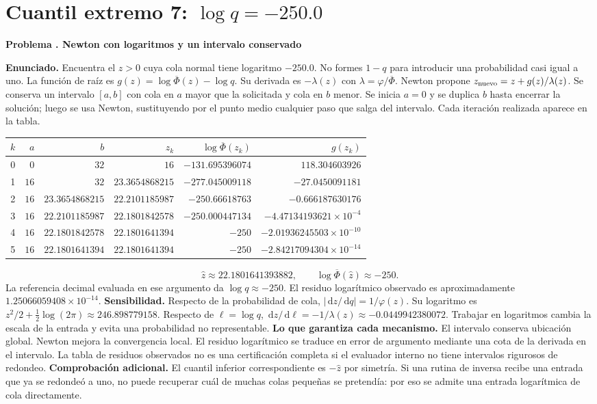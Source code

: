\documentclass[11pt,a4paper]{article}
\newcommand{\dd}{\,\mathrm d}
\theoremstyle{definition}
\newcounter{problema}
\newenvironment{resuelto}[1]{\refstepcounter{problema}\par\medskip\Needspace{6\baselineskip}\textbf{Problema \theproblema. #1}\par}{\par\medskip}
\newcommand{\SF}{\overline\Phi}
\begin{document}
\section{\texorpdfstring{Cuantil extremo 7: $\log q=-250.0$}{Cuantil extremo 7: log q=-250.0}}
\begin{resuelto}{Newton con logaritmos y un intervalo conservado}
\textbf{Enunciado.} Encuentra el $z>0$ cuya cola normal tiene logaritmo $-250.0$. No formes $1-q$ para introducir una probabilidad casi igual a uno.
La función de raíz es $g(z)=\log\SF(z)-\log q$. Su derivada es $-\lambda(z)$ con $\lambda=\varphi/\SF$. Newton propone $z_{\rm nuevo}=z+g(z)/\lambda(z)$. Se conserva un intervalo $[a,b]$ con cola en $a$ mayor que la solicitada y cola en $b$ menor.
Se inicia $a=0$ y se duplica $b$ hasta encerrar la solución; luego se usa Newton, sustituyendo por el punto medio cualquier paso que salga del intervalo. Cada iteración realizada aparece en la tabla.

\begin{center}\small\begin{tabular}{rrrrrr}
\toprule
$k$&$a$&$b$&$z_k$&$\log\SF(z_k)$&$g(z_k)$\\
\midrule
0&$0$&$32$&$16$&$-131.695396074$&$118.304603926$\\
1&$16$&$32$&$23.3654868215$&$-277.045009118$&$-27.0450091181$\\
2&$16$&$23.3654868215$&$22.2101185987$&$-250.66618763$&$-0.666187630176$\\
3&$16$&$22.2101185987$&$22.1801842578$&$-250.000447134$&$-4.47134193621\times10^{-4}$\\
4&$16$&$22.1801842578$&$22.1801641394$&$-250$&$-2.01936245503\times10^{-10}$\\
5&$16$&$22.1801641394$&$22.1801641394$&$-250$&$-2.84217094304\times10^{-14}$\\
\bottomrule\end{tabular}\end{center}
\[
\widehat z\approx22.1801641393882,\qquad \log\SF(\widehat z)\approx-250.
\]
La referencia decimal evaluada en ese argumento da $\log q\approx-250$. El residuo logarítmico observado es aproximadamente $1.25066059408\times10^{-14}$.
\textbf{Sensibilidad.} Respecto de la probabilidad de cola, $|\dd z/\dd q|=1/\varphi(z)$. Su logaritmo es $z^2/2+\tfrac12\log(2\pi)\approx246.898779158$. Respecto de $\ell=\log q$, $\dd z/\dd\ell=-1/\lambda(z)\approx-0.0449942380072$. Trabajar en logaritmos cambia la escala de la entrada y evita una probabilidad no representable.
\textbf{Lo que garantiza cada mecanismo.} El intervalo conserva ubicación global. Newton mejora la convergencia local. El residuo logarítmico se traduce en error de argumento mediante una cota de la derivada en el intervalo. La tabla de residuos observados no es una certificación completa si el evaluador interno no tiene intervalos rigurosos de redondeo.
\textbf{Comprobación adicional.} El cuantil inferior correspondiente es $-\widehat z$ por simetría. Si una rutina de inversa recibe una entrada que ya se redondeó a uno, no puede recuperar cuál de muchas colas pequeñas se pretendía: por eso se admite una entrada logarítmica de cola directamente.
\end{resuelto}
\end{document}

